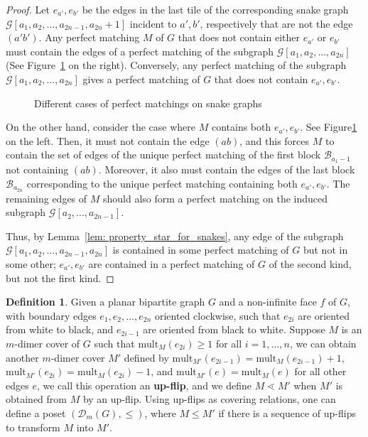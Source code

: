 \documentclass[11pt]{amsart}
\theoremstyle{definition}
\newtheorem{defn}[thm]{Definition}
\theoremstyle{remark}
\numberwithin{equation}{section}
\begin{document}
\begin{proof}
    Let $e_{a'},e_{b'}$ be the edges in the last tile of the corresponding snake graph $\mathcal{G}[a_1,a_2,...,a_{2n-1},a_{2n}+1]$ incident to $a',b'$, respectively that are not the edge $(a'b')$. Any perfect matching $M$ of $G$ that does not contain either $e_{a'}$ or $e_{b'}$ must contain the edges of a perfect matching of the subgraph $\mathcal{G}[a_1,a_2,...,a_{2n}]$ (See Figure~\ref{fig:property_star_on_band} on the right). Conversely, any perfect matching of the subgraph $\mathcal{G}[a_1,a_2,...,a_{2n}]$ gives a perfect matching of $G$ that does not contain $e_{a'},e_{b'}$. 

    \begin{figure}[h!]
    \centering
    
    \caption{Different cases of perfect matchings on snake graphs}
    \label{fig:property_star_on_band}
    \end{figure}

    On the other hand, consider the case where $M$ contains both $e_{a'}, e_{b'}$. See Figure\ref{fig:property_star_on_band} on the left. Then, it must not contain the edge $(ab)$, and this forces $M$ to contain the set of edges of the unique perfect matching of the first block $\mathcal{B}_{a_1-1}$ not containing $(ab)$. Moreover, it also must contain the edges of the last block $\mathcal{B}_{a_{2n}}$ corresponding to the unique perfect matching containing both $e_{a'}, e_{b'}$. The remaining edges of $M$ should also form a perfect matching on the induced subgraph $\mathcal{G}[a_2,...,a_{2n-1}]$.

    Thus, by Lemma~\ref{lem: property_star_for_snakes}, any edge of the subgraph $\mathcal{G}[a_1,a_2,...,a_{2n-1},a_{2n}]$ is contained in some perfect matching of $G$ but not in some other; $e_{a'}, e_{b'}$ are contained in a perfect matching of $G$ of the second kind, but not the first kind.
\end{proof}
\begin{defn}
    Given a planar bipartite graph $G$ and a non-infinite face $f$ of $G$, with boundary edges $e_1,e_2,...,e_{2n}$ oriented clockwise, such that $e_{2i}$ are oriented from white to black, and $e_{2i-1}$ are oriented from black to white. Suppose $M$ is an $m$-dimer cover of $G$ such that $\text{mult}_{M}(e_{2i})\geq 1$ for all $i=1,...,n$, we can obtain another $m$-dimer cover $M'$ defined by $\text{mult}_{M'}(e_{2i-1}) = \text{mult}_{M}(e_{2i-1})+1$, $\text{mult}_{M'}(e_{2i}) = \text{mult}_{M}(e_{2i})-1$, and $\text{mult}_{M'}(e) = \text{mult}_{M}(e)$ for all other edges $e$, we call this operation an \textbf{up-flip}, and we define $M\lessdot M'$ when $M'$ is obtained from $M$ by an up-flip. Using up-flips as covering relations, one can define a poset $(\mathcal{D}_{m}(G), \leq)$, where $M\leq M'$ if there is a sequence of up-flips to transform $M$ into $M'$.
\end{defn}
\end{document}
